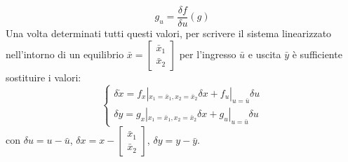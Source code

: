 \[
    g_u = \frac{\delta f}{\delta u} (g)
\]
Una volta determinati tutti questi valori, per scrivere il sistema linearizzato nell'intorno di un equilibrio $\bar{x} = \left[\begin{matrix}
    \bar{x}_1 \\ \bar{x}_2
\end{matrix}\right]$ per l'ingresso $\bar{u}$ e uscita $\bar{y}$ è sufficiente sostituire i valori:
\[
    \begin{cases}
        \delta \dot{x} = f_x|_{x_1 = \bar{x}_1, x_2 = \bar{x}_2} \delta x + f_u|_{u = \bar{u}}\delta u\\
        \delta y = g_x|_{x_1 = \bar{x}_1, x_2 = \bar{x}_2} \delta x + g_u|_{u = \bar{u}} \delta u
    \end{cases}
\]
con $ \delta u = u - \bar{u}$, $\delta x = x -\left[\begin{matrix}
    \bar{x}_1 \\ \bar{x}_2
\end{matrix}\right]$, $ \delta y = y - \bar{y}$.